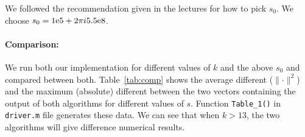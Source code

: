 We followed the recommendation given in the lectures for how to pick $s_{0}$. We choose $s_{0} = {1}\mathrm{e}{5} + 2\pi i {5.5}\mathrm{e}{8} $. 

\paragraph{Comparison:} We run both our implementation for different values of $k$ and the above $s_{0}$ and compared between both. Table~\ref{tab:comp} shows the average different ($\parallel \cdot \parallel^{2}$) and the maximum (absolute) different between the two vectors containing the output of both algorithms for different values of $s$. Function \texttt{Table\_1()} in \texttt{driver.m} file generates these data. We can see that when $k>13$, the two algorithms will give difference numerical results. 

